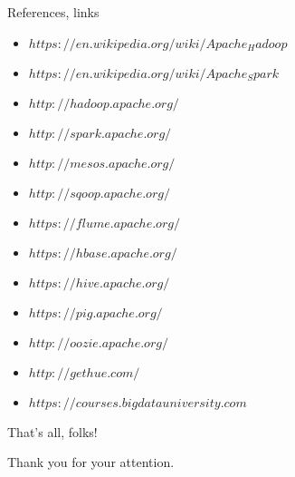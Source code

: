 \begin{frame}{References, links}
  \begin{block}{}
    \begin{itemize}
      \item $https://en.wikipedia.org/wiki/Apache_Hadoop$
      \item	$https://en.wikipedia.org/wiki/Apache_Spark$
      \item $http://hadoop.apache.org/$
      \item	$http://spark.apache.org/$ 
      \item $http://mesos.apache.org/$
      \item $http://sqoop.apache.org/$
      \item $https://flume.apache.org/$
      \item	$https://hbase.apache.org/$
      \item	$https://hive.apache.org/$
      \item	$https://pig.apache.org/$
      \item	$http://oozie.apache.org/$
      \item	$http://gethue.com/$
      \item	$https://courses.bigdatauniversity.com$
    \end{itemize}
  \end{block}
\end{frame}

\begin{frame}{That's all, folks!}
  \begin{block}{}
    Thank you for your attention. 
  \end{block}
\end{frame}

